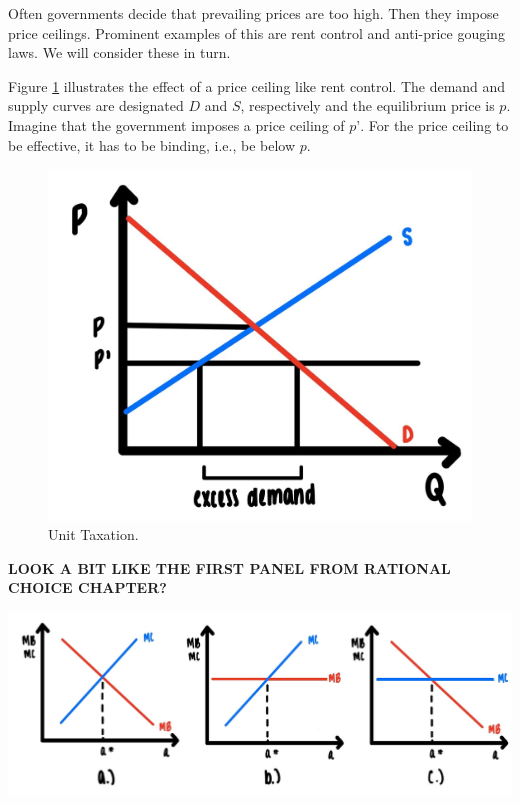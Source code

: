 \documentclass[
]{book}
\begin{document}
Often governments decide that prevailing prices are too high. Then they impose price ceilings. Prominent examples of this are rent control and anti-price gouging laws. We will consider these in turn.

Figure \ref{fig:compmarkets04} illustrates the effect of a price ceiling like rent control. The demand and supply curves are designated \(D\) and \(S\), respectively and the equilibrium price is \(p\). Imagine that the government imposes a price ceiling of \(p’\). For the price ceiling to be effective, it has to be binding, i.e., be below \(p\).

\begin{figure}

{\centering \includegraphics[width=0.75\linewidth]{img/compmarkets/fig4} 

}

\caption{Unit Taxation.}\label{fig:compmarkets04}
\end{figure}

\begin{iucolor2}

\begin{center}
\textbf{LOOK A BIT LIKE THE FIRST PANEL FROM RATIONAL CHOICE CHAPTER?}

\end{center}

\begin{center}\includegraphics[width=1\linewidth]{img/rationalchoice/panels} \end{center}

\end{iucolor2}
\end{document}
